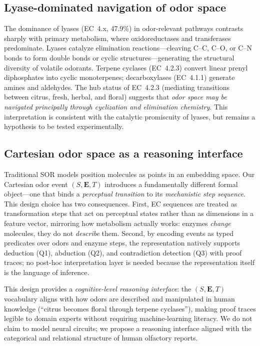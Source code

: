 \documentclass[a4paper,fleqn]{cas-sc}
\begin{document}
\subsection{Lyase-dominated navigation of odor space}

The dominance of lyases (EC~4.x, 47.9\%) in odor-relevant pathways contrasts sharply with primary metabolism, where oxidoreductases and transferases predominate. Lyases catalyze elimination reactions---cleaving C--C, C--O, or C--N bonds to form double bonds or cyclic structures---generating the structural diversity of volatile odorants. Terpene cyclases (EC~4.2.3) convert linear prenyl diphosphates into cyclic monoterpenes; decarboxylases (EC~4.1.1) generate amines and aldehydes. The hub status of EC~4.2.3 (mediating transitions between citrus, fresh, herbal, and floral) suggests that \emph{odor space may be navigated principally through cyclization and elimination chemistry}. This interpretation is consistent with the catalytic promiscuity of lyases, but remains a hypothesis to be tested experimentally.

\subsection{Cartesian odor space as a reasoning interface}

Traditional SOR models position molecules as points in an embedding space. Our Cartesian odor event $(S, \mathbf{E}, T)$ introduces a fundamentally different formal object---one that binds a \emph{perceptual transition} to its \emph{mechanistic step sequence}. This design choice has two consequences. First, EC sequences are treated as transformation steps that act on perceptual states rather than as dimensions in a feature vector, mirroring how metabolism actually works: enzymes \emph{change} molecules, they do not \emph{describe} them. Second, by encoding events as typed predicates over odors and enzyme steps, the representation natively supports deduction (Q1), abduction (Q2), and contradiction detection (Q3) with proof traces; no post-hoc interpretation layer is needed because the representation itself is the language of inference.

This design provides a \emph{cognitive-level reasoning interface}: the $(S, \mathbf{E}, T)$ vocabulary aligns with how odors are described and manipulated in human knowledge (``citrus becomes floral through terpene cyclases''), making proof traces legible to domain experts without requiring machine-learning literacy. We do not claim to model neural circuits; we propose a reasoning interface aligned with the categorical and relational structure of human olfactory reports.
\end{document}
